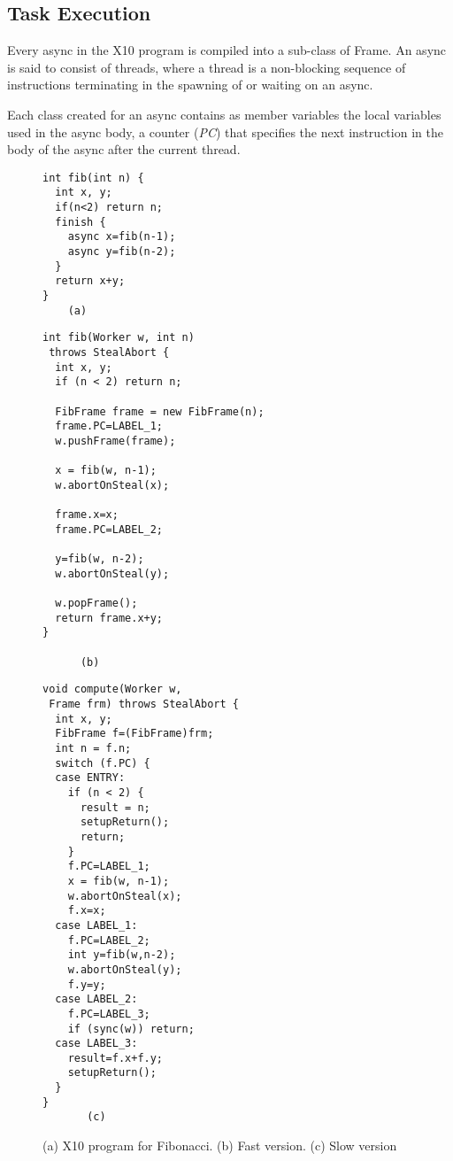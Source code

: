 
\subsection{Task Execution}

Every async in the X10 program is compiled into a sub-class of
Frame. An async is said to consist of threads, where a thread is a
non-blocking sequence of instructions terminating in the spawning of or
waiting on an async. 

Each class created for an async contains as member variables the local
variables used in the async body, a counter ({\em PC}) that specifies
the next instruction in the body of the async after the current
thread.

\begin{figure*}
\begin{minipage}{0.25\textwidth}
\begin{verbatim}
int fib(int n) {
  int x, y;
  if(n<2) return n;
  finish {
    async x=fib(n-1);
    async y=fib(n-2);
  }
  return x+y;
}
    (a)
\end{verbatim}
\end{minipage}%
\begin{minipage}{0.4\textwidth}
\begin{verbatim}
int fib(Worker w, int n) 
 throws StealAbort { 
  int x, y;
  if (n < 2) return n;

  FibFrame frame = new FibFrame(n);
  frame.PC=LABEL_1;
  w.pushFrame(frame);

  x = fib(w, n-1);
  w.abortOnSteal(x);

  frame.x=x;
  frame.PC=LABEL_2;

  y=fib(w, n-2);
  w.abortOnSteal(y);

  w.popFrame();
  return frame.x+y;
}

      (b)
\end{verbatim}
\end{minipage}%
\begin{minipage}{0.45\textwidth}
\begin{verbatim}
void compute(Worker w, 
 Frame frm) throws StealAbort {
  int x, y;
  FibFrame f=(FibFrame)frm;
  int n = f.n;
  switch (f.PC) {
  case ENTRY: 
    if (n < 2) {
      result = n;
      setupReturn();
      return;
    }
    f.PC=LABEL_1;
    x = fib(w, n-1);
    w.abortOnSteal(x);
    f.x=x;
  case LABEL_1: 
    f.PC=LABEL_2;
    int y=fib(w,n-2);
    w.abortOnSteal(y);
    f.y=y;
  case LABEL_2: 
    f.PC=LABEL_3;
    if (sync(w)) return;
  case LABEL_3:
    result=f.x+f.y;
    setupReturn();
  }
}
       (c)
\end{verbatim}
\end{minipage}%
\caption{(a) X10 program for Fibonacci. (b) Fast version. (c) Slow version}%
\label{fig:fib-ill}
\end{figure*}

